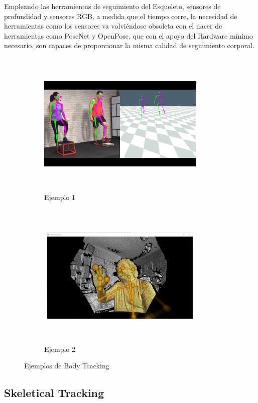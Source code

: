 Empleando las herramientas de seguimiento del Esqueleto, sensores de profundidad y sensores RGB, a medida que el tiempo corre, la necesidad de herramientas como los sensores va volviéndose obsoleta con el nacer de herramientas como PoseNet y OpenPose, que con el apoyo del Hardware mínimo necesario, son capaces de proporcionar la misma calidad de seguimiento corporal.

\begin{figure}
	\centering
	\begin{subfigure}{.5\textwidth}
		\centering
		\includegraphics[width=8cm,height=7cm,]{./Images/examplebodytracking.jpg}
		\caption{Ejemplo 1}
		\label{bodyexa1}
	\end{subfigure}%
	\begin{subfigure}{0.5\textwidth}
		\centering
		\includegraphics[width=8cm,height=7cm,]{./Images/examplekinect.jpg}
		\caption{Ejemplo 2}
		\label{bodyexa2}
	\end{subfigure}
	\caption{Ejemplos de Body Tracking}
	\label{bodyexafigure}
\end{figure}
\subsection{Skeletical Tracking}

